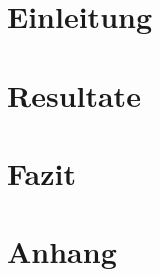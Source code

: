 \documentclass[12pt, a4paper, twoside]{report}
\title{}
\author{}
\date{\today}
\begin{document}
 



 
\renewcommand{\contentsname}{Inhaltsverzeichnis}
\renewcommand{\listfigurename}{Abbildungsverzeichnis}

\renewcommand{\listtablename}{Tabellenverzeichnis}

\renewcommand{\figurename}{Abbildung}
\tableofcontents



\printglossary[title=Glossar, toctitle=Glossar]

\chapter{Einleitung}


\chapter{Resultate}


\chapter{Fazit}


\printbibliography[title={Literaturverzeichnis}, heading=bibintoc]

\listoffigures

\listoftables

\appendix
\chapter{Anhang}

\end{document}
